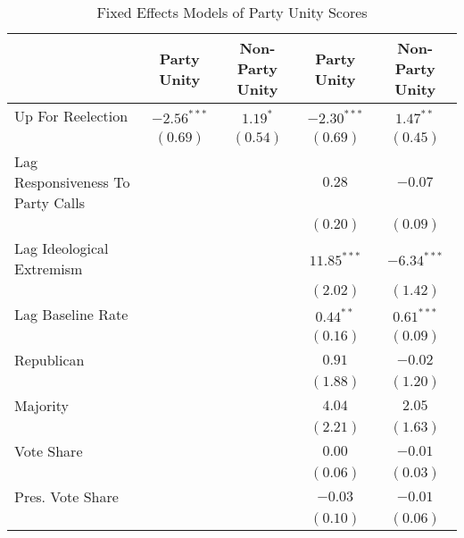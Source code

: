 \documentclass[12pt]{article}
\begin{document}
\begin{table}[!htbp]
\centering
\begin{threeparttable}
\singlespacing
\small
\caption{Fixed Effects Models of Party Unity Scores}
\label{tab-party-unity-reelection}
\begin{tabular}{l c c c c }
\hline
 & Party Unity & Non-Party Unity & Party Unity & Non-Party Unity \\
\hline
Up For Reelection                 & $-2.56^{***}$ & $1.19^{*}$ & $-2.30^{***}$ & $1.47^{**}$   \\
                                  & $(0.69)$      & $(0.54)$   & $(0.69)$      & $(0.45)$      \\
Lag Responsiveness To Party Calls &               &            & $0.28$        & $-0.07$       \\
                                  &               &            & $(0.20)$      & $(0.09)$      \\
Lag Ideological Extremism         &               &            & $11.85^{***}$ & $-6.34^{***}$ \\
                                  &               &            & $(2.02)$      & $(1.42)$      \\
Lag Baseline Rate                 &               &            & $0.44^{**}$   & $0.61^{***}$  \\
                                  &               &            & $(0.16)$      & $(0.09)$      \\
Republican                  &               &            & $0.91$        & $-0.02$       \\
                                  &               &            & $(1.88)$      & $(1.20)$      \\
Majority                          &               &            & $4.04$        & $2.05$        \\
                                  &               &            & $(2.21)$      & $(1.63)$      \\
Vote Share                        &               &            & $0.00$        & $-0.01$       \\
                                  &               &            & $(0.06)$      & $(0.03)$      \\
Pres. Vote Share                   &               &            & $-0.03$       & $-0.01$       \\
                                  &               &            & $(0.10)$      & $(0.06)$      \\

\end{tabular}
\end{threeparttable}
\end{table}
\end{document}
